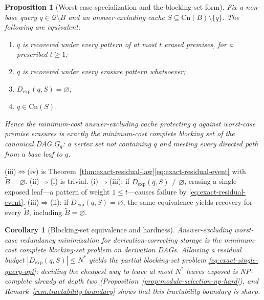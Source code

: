 \documentclass[journal]{IEEEtran}
\makeatletter
\newcommand{\Cn}{\text{Cn}}
\newtheorem{proposition}{Proposition}[section]
\newtheorem{corollary}{Corollary}[section]
\numberwithin{equation}{section}
\renewenvironment{proof}[1][\proofname]{\par
  \pushQED{\qed}%
  \normalfont \topsep6\p@\@plus6\p@\relax
  \trivlist
  \item[\hskip\labelsep
        \itshape
    #1\@addpunct{.}]\ignorespaces
}{%
  \popQED\endtrivlist\@endpefalse
}
\makeatother
\begin{document}
\begin{proposition}[Worst-case specialization and the blocking-set form]
\label{prop:worst-case-blocking}
Fix a non-base query \(q\in\mathcal Q\setminus B\) and an answer-excluding
cache \(S\subseteq\Cn(B)\setminus\{q\}\).  The following are equivalent:
\begin{enumerate}[label=(\roman*)]
\item \(q\) is recovered under every pattern of at most \(t\) erased
premises, for a prescribed \(t\ge 1\);
\item \(q\) is recovered under every erasure pattern whatsoever;
\item \(D_{\mathrm{exp}}(q,S)=\varnothing\);
\item \(q\in\Cn(S)\).
\end{enumerate}
Hence the minimum-cost answer-excluding cache protecting \(q\) against
worst-case premise erasures is exactly the minimum-cost complete blocking
set of the canonical DAG \(G_q\): a vertex set not containing \(q\) and
meeting every directed path from a base leaf to \(q\).
\end{proposition}

\begin{proof}
(iii)\(\Leftrightarrow\)(iv) is
Theorem~\ref{thm:exact-residual-law}\eqref{eq:exact-residual-event} with
\(\widetilde B=\varnothing\).  (ii)\(\Rightarrow\)(i) is trivial.
(i)\(\Rightarrow\)(iii): if \(D_{\mathrm{exp}}(q,S)\neq\varnothing\),
erasing a single exposed leaf---a pattern of weight \(1\le t\)---causes
failure by \eqref{eq:exact-residual-event}.
(iii)\(\Rightarrow\)(ii): if \(D_{\mathrm{exp}}(q,S)=\varnothing\), the
same equivalence yields recovery for every \(\widetilde B\), including
\(\widetilde B=\varnothing\).
\end{proof}

\begin{corollary}[Blocking-set equivalence and hardness]
\label{cor:blocking-hardness}
Answer-excluding worst-case redundancy minimization for
derivation-correcting storage is the minimum-cost complete blocking-set
problem on derivation DAGs.
Allowing a residual budget \(|D_{\mathrm{exp}}(q,S)|\le N^{*}\) yields the
partial blocking-set problem \eqref{eq:exact-single-query-opt}: deciding
the cheapest way to leave at most \(N^{*}\) leaves exposed is NP-complete
already at depth two (Proposition~\ref{prop:module-selection-np-hard}),
and Remark~\ref{rem:tractability-boundary} shows that this tractability
boundary is sharp.
\end{corollary}
\end{document}
